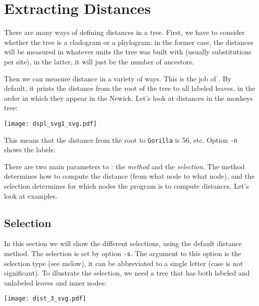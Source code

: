 \section{Extracting Distances}

There are many ways of defining distances in a tree. First, we have to consider
whether the tree is a cladogram or a phylogram: in the former case, the
distances will be measured in whatever units the tree was built with (usually
substitutions per site), in the latter, it will just be the number of ancestors.

Then we can measure distance in a variety of ways. This is the job of
\distance. By default, it prints the distance from the root of the tree to all
labeled leaves, in the order in which they appear in the Newick. Let's look at
distances in the monkeys tree:

\begin{center}
\texttt{[image: dspl\_svg1\_svg.pdf]}
\end{center}


\begin{samepage}

\end{samepage}
This means that the distance from the root to \texttt{Gorilla} is 56, etc. Option \texttt{-n} shows the labels:

\begin{samepage}

\end{samepage}

There are two main parameters to \distance: the \emph{method} and the
\emph{selection}. The method determines how to compute the distance (from what
node to what node), and the selection determines for which nodes the program is
to compute distances. Let's look at examples.

\subsection{Selection}

In this section we will show the different selections, using the default
distance method. The selection is set by option \texttt{-s}. The argument to
this option is the selection type (see melow), it can be abbreviated to a
single letter (case is not significant). To illustrate the selection, we need a tree that has both labeled and unlabeled leaves and inner nodes:

\begin{center}
\texttt{[image: dist\_3\_svg.pdf]}
\end{center}

